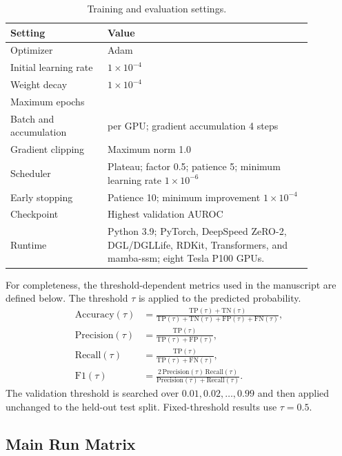 \begin{table}[!htbp]
\centering
\caption{Training and evaluation settings.}
\label{tab:si_training_evaluation}
\scriptsize
\setlength{\tabcolsep}{4pt}
\begin{tabular}{>{\RaggedRight\arraybackslash}p{0.28\linewidth}>{\RaggedRight\arraybackslash}p{0.59\linewidth}}
\toprule
Setting & Value \\
\midrule
Optimizer & Adam \\
Initial learning rate & $1\times10^{-4}$ \\
Weight decay & $1\times10^{-4}$ \\
Maximum epochs & 100 \\
Batch and accumulation & 16 per GPU; gradient accumulation 4 steps \\
Gradient clipping & Maximum norm 1.0 \\
Scheduler & Plateau; factor 0.5; patience 5; minimum learning rate $1\times10^{-6}$ \\
Early stopping & Patience 10; minimum improvement $1\times10^{-4}$ \\
Checkpoint & Highest validation AUROC \\
Runtime & Python 3.9; PyTorch, DeepSpeed ZeRO-2, DGL/DGLLife, RDKit, Transformers, and mamba-ssm; eight Tesla P100 GPUs. \\
\bottomrule
\end{tabular}
\end{table}

For completeness, the threshold-dependent metrics used in the manuscript are
defined below. The threshold $\tau$ is applied to the predicted probability.
\begin{align}
\mathrm{Accuracy}(\tau)
 &= \frac{\mathrm{TP}(\tau)+\mathrm{TN}(\tau)}
 {\mathrm{TP}(\tau)+\mathrm{TN}(\tau)+\mathrm{FP}(\tau)+\mathrm{FN}(\tau)},\\
\mathrm{Precision}(\tau)
 &= \frac{\mathrm{TP}(\tau)}{\mathrm{TP}(\tau)+\mathrm{FP}(\tau)},\\
\mathrm{Recall}(\tau)
 &= \frac{\mathrm{TP}(\tau)}{\mathrm{TP}(\tau)+\mathrm{FN}(\tau)},\\
\mathrm{F1}(\tau)
 &= \frac{2\,\mathrm{Precision}(\tau)\,\mathrm{Recall}(\tau)}
 {\mathrm{Precision}(\tau)+\mathrm{Recall}(\tau)}.
\end{align}
The validation threshold is searched over $0.01,0.02,\ldots,0.99$ and then
applied unchanged to the held-out test split. Fixed-threshold results use
$\tau=0.5$.

\subsection{Main Run Matrix}

